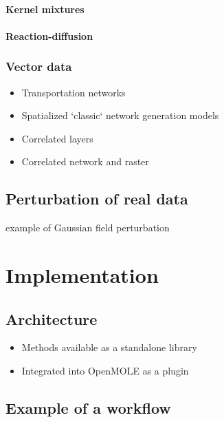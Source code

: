 \paragraph{Kernel mixtures}


\paragraph{Reaction-diffusion}





\subsubsection{Vector data}

\begin{itemize}
	\item Transportation networks
	\item Spatialized `classic` network generation models
	\item Correlated layers	
	\item Correlated network and raster 
\end{itemize}



\subsection{Perturbation of real data}

\cite{constantine2012method} example of Gaussian field perturbation







\section{Implementation}


\subsection{Architecture}

\begin{itemize}
	\item Methods available as a standalone library
	\item Integrated into OpenMOLE as a plugin
\end{itemize}



\subsection{Example of a workflow}

